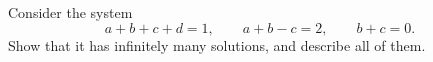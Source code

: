 Consider the system
\[a+b+c+d=1,\qquad a+b-c=2,\qquad b+c=0.\]
Show that it has infinitely many solutions, and describe all of them.
